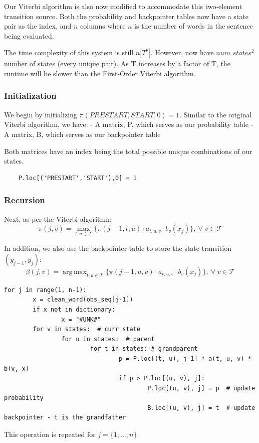 \documentclass{article}
\DeclareMathOperator*{\argmax}{arg\,max}
\numberwithin{equation}{section}
\begin{document}
Our Viterbi algorithm is also now modified to accommodate this two-element transition source. Both the probability and backpointer tables now have a state pair as the index, and $n$ columns where $n$ is the number of words in the sentence being evaluated.

The time complexity of this system is still $n|T^2|$. However, now have $num\_states^2$ number of states (every unique pair). As T increases by a factor of T, the runtime will be slower than the First-Order Viterbi algorithm.

\subsubsection{Initialization}
We begin by initializing $\pi(PRESTART,START,0) = 1$.
Similar to the original Viterbi algorithm, we have:
- A matrix, P, which serves as our probability table
- A matrix, B, which serves as our backpointer table

Both matrices have an index being the total possible unique combinations of our states.

\begin{verbatim}
	P.loc[('PRESTART','START'),0] = 1
\end{verbatim}

\subsubsection{Recursion}
Next, as per the Viterbi algorithm:
	$$ \pi(j, v) = \max_{t, u\in\mathcal{T}} \{ \pi(j-1, t, u) \cdot a_{t, u, v} \cdot b_v(x_j) \}, \: \forall\; v \in \mathcal{T} $$

In addition, we also use the backpointer table to store the state transition $(y_{j-1}, y_j)$:
	$$\beta(j, v) = \argmax_{t, u\in\mathcal{T}} \{ \pi(j-1, u, v) \cdot a_{t, u, v} \cdot b_v(x_j) \}, \: \forall\; v \in \mathcal{T} $$

\begin{verbatim}
for j in range(1, n-1):
		x = clean_word(obs_seq[j-1])
		if x not in dictionary:
				x = "#UNK#"
		for v in states:  # curr state
				for u in states:  # parent
						for t in states: # grandparent
								p = P.loc[(t, u), j-1] * a(t, u, v) * b(v, x)
								if p > P.loc[(u, v), j]:
										P.loc[(u, v), j] = p  # update probability
										B.loc[(u, v), j] = t  # update backpointer - t is the grandfather
\end{verbatim}

This operation is repeated for $j = \{1, ..., n\}$.
\end{document}
